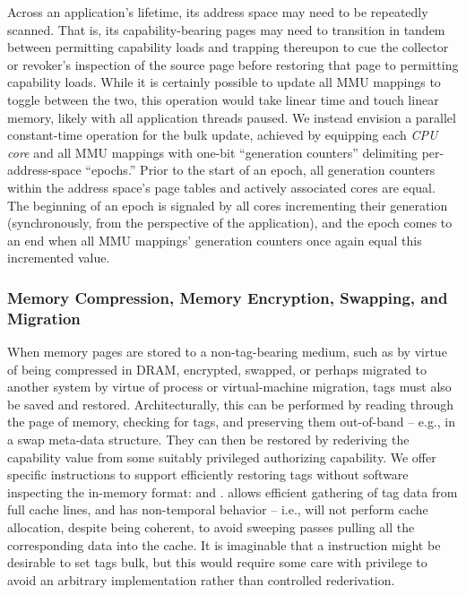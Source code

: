 Across an application's lifetime, its address space may need to be repeatedly
scanned.  That is, its capability-bearing pages may need to transition in
tandem between permitting capability loads and trapping thereupon to cue the
collector or revoker's inspection of the source page before restoring that page
to permitting capability loads.  While it is certainly possible to update all
MMU mappings to toggle between the two, this operation would take linear time
and touch linear memory, likely with all application threads paused.  We
instead envision a parallel constant-time operation for the bulk update,
achieved by equipping each \emph{CPU core} and all MMU mappings with one-bit
``generation counters'' delimiting per-address-space ``epochs.'' Prior to the
start of an epoch, all generation counters within the address space's page
tables and actively associated cores are equal.  The beginning of an epoch is
signaled by all cores incrementing their generation (synchronously, from the
perspective of the application), and the epoch comes to an end when all MMU
mappings' generation counters once again equal this incremented value.


\subsubsection{Memory Compression, Memory Encryption, Swapping, and Migration}

When memory pages are stored to a non-tag-bearing medium, such as by virtue
of being compressed in DRAM, encrypted, swapped, or perhaps migrated to
another system by virtue of process or virtual-machine migration, tags must
also be saved and restored.
Architecturally, this can be performed by reading through the page of memory,
checking for tags, and preserving them out-of-band -- e.g., in a swap
meta-data structure.
They can then be restored by rederiving the capability value from some
suitably privileged authorizing capability.
We offer specific instructions to support efficiently restoring tags without
software inspecting the in-memory format:  and
.
 allows efficient gathering of tag data from full
cache lines, and has non-temporal behavior -- i.e., will not perform
cache allocation, despite being coherent, to avoid sweeping passes pulling
all the corresponding data into the cache.
It is imaginable that a  instruction might be
desirable to set tags bulk, but this would require some care with privilege to
avoid an arbitrary  implementation rather than
controlled rederivation.

